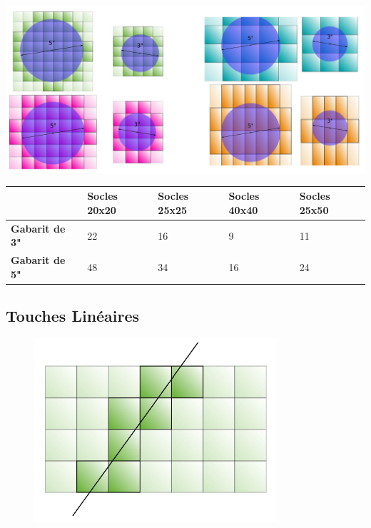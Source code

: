 \includegraphics[width=17cm]{gabarits_1.png}

\begin{tabular}{M{2.5cm}|M{2.5cm}M{2.5cm}M{2.5cm}M{2.5cm}}
 & \textbf{Socles 20x20} & \textbf{Socles 25x25} & \textbf{Socles 40x40} & \textbf{Socles 25x50} \\
\hline
\textbf{Gabarit de 3"} & 22 & 16 & 9 & 11 \\
\hline
\textbf{Gabarit de 5"} & 48 & 34 & 16 & 24 \\
\end{tabular}

\subsection{Touches Linéaires}

\begin{figure}[!htbp]
\centering
\includegraphics[width=9cm]{gabarits_2.png}
\end{figure}